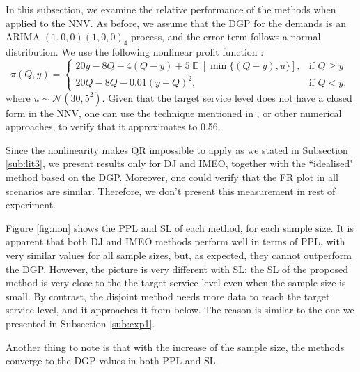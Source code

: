 \documentclass{article}
\DeclareMathOperator{\E}{\mathbb{E}}
\begin{document}
In this subsection, we examine the relative performance of the methods when applied to the NNV. As before, we assume that the DGP for the demands is an ARIMA $(1,0,0)(1,0,0)_4$ process, and the error term follows a normal distribution. We use the following nonlinear profit function \cite{KK18}:
\[
    \pi(Q,y)=
    \begin{cases}
        20y-8Q-4(Q-y)+5\E[\min \{(Q-y),u\}],& \text{if } Q\geq y\\
        20Q-8Q-0.01(y-Q)^2,& \text{if } Q< y,
    \end{cases}
\]
where $u\sim \mathcal{N}(30,5^2)$. Given that the target service level does not have a closed form in the NNV, one can use the technique mentioned in \cite{KK18}, or other numerical approaches, to verify that it approximates to 0.56.

Since the nonlinearity makes QR impossible to apply as we stated in Subsection \ref{sub:lit3}, we present results only for DJ and IMEO, together with the ``idealised" method based on the DGP. Moreover, one could verify that the FR plot in all scenarios are similar. Therefore, we don't present this measurement in rest of experiment.

Figure \ref{fig:non} shows the PPL and SL of each method, for each sample size. It is apparent that both DJ and IMEO methods perform well in terms of PPL, with very similar values for all sample sizes, but, as expected, they cannot outperform the DGP. However, the picture is very different with SL: the SL of the proposed method is very close to the the target service level even when the sample size is small. By contrast, the disjoint method needs more data to reach the target service level, and it approaches it from below. The reason is similar to the one we presented in Subsection \ref{sub:exp1}. 

Another thing to note is that with the increase of the sample size, the methods converge to the DGP values in both PPL and SL.
\end{document}
